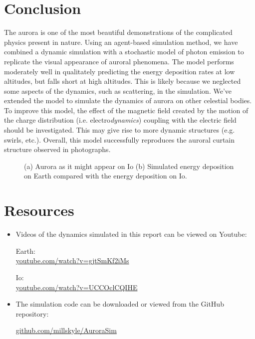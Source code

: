 \documentclass[twocolumn]{article}
\newcommand{\insertfigurewide}[3]{\begin{figure*}[bth]
\centering
	\makebox[\columnwidth][c]{
	\texttt{[image: \#1]}
	}
\caption{#3}
\label{#1}
\end{figure*}}
\begin{document}
\section*{Conclusion}
The aurora is one of the most beautiful demonstrations of the complicated physics present in nature.  Using an agent-based simulation method, we have combined a dynamic simulation with a stochastic model of photon emission to replicate the visual appearance of auroral phenomena.  The model performs moderately well in qualitately predicting the energy deposition rates at low altitudes, but falls short at high altitudes.  This is likely because we neglected some aspects of the dynamics, such as scattering, in the simulation.  We've extended the model to simulate the dynamics of aurora on other celestial bodies.  To improve this model, the effect of the magnetic field created by the motion of the charge distribution (i.e. electro\emph{dynamics}) coupling with the electric field should be investigated.  This may give rise to more dynamic structures (e.g. swirls, etc.).   Overall, this model successfully reproduces the auroral curtain structure observed in photographs. \insertfigurewide{../presentation/img/io_picture.pdf}{2.0}{(a) Aurora as it might appear on Io (b) Simulated energy deposition on Earth compared with the energy deposition on Io. }


\vfill

\section*{Resources}

\begin{itemize}

\item Videos of the dynamics simulated in this report can be viewed on Youtube:

Earth:\\
\href{https://www.youtube.com/watch?v=gjtSmKf2iMs}{youtube.com/watch?v=gjtSmKf2iMs}

Io:\\
\href{https://www.youtube.com/watch?v=UCCOclCQIHE}{youtube.com/watch?v=UCCOclCQIHE}


\item The simulation code can be downloaded or viewed from the GitHub repository:

\href{https://github.com/millskyle/AuroraSim}{github.com/millskyle/AuroraSim}

\end{itemize}


\clearpage
{}



\end{document}
